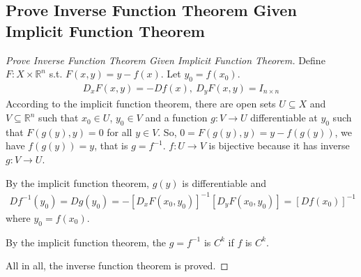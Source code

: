\documentclass[11pt]{elegantbook}
\begin{document}
\subsection{Prove Inverse Function Theorem Given Implicit Function Theorem}
\begin{proof}[Prove Inverse Function Theorem Given Implicit Function Theorem]
    Define $F:X\times \mathbb{R}^n$ s.t. $F(x,y)=y-f(x)$. Let $y_0=f(x_0)$.
    \begin{equation}
        \begin{aligned}
            D_x F(x,y)=-Df(x),\ D_y F(x,y)=I_{n\times n}
        \end{aligned}
        \nonumber
    \end{equation}
    According to the implicit function theorem, there are open sets $U \subseteq X$ and $V \subseteq \mathbb{R}^n$ such that $x_0 \in U$, $y_0 \in V$ and a function $g : V \rightarrow U$ differentiable at $y_0$ such that $F(g(y), y) = 0$ for all $y \in V$. So, $0=F(g(y),y)=y-f(g(y))$, we have $f(g(y))=y$, that is $g=f^{-1}$.
    $f: U \rightarrow V$ is bijective because it has inverse $g : V \rightarrow U$.

    By the implicit function theorem, $g(y)$ is differentiable and
    \begin{equation}
        \begin{aligned}
            Df^{-1}(y_0)=Dg(y_0)=-[D_x F(x_0,y_0)]^{-1}[D_y F(x_0,y_0)]=[Df(x_0)]^{-1}
        \end{aligned}
        \nonumber
    \end{equation}
    where $y_0=f(x_0)$.
    
    By the implicit function theorem, the $g=f^{-1}$ is $C^k$ if $f$ is $C^k$.

    All in all, the inverse function theorem is proved.
\end{proof}
\end{document}
